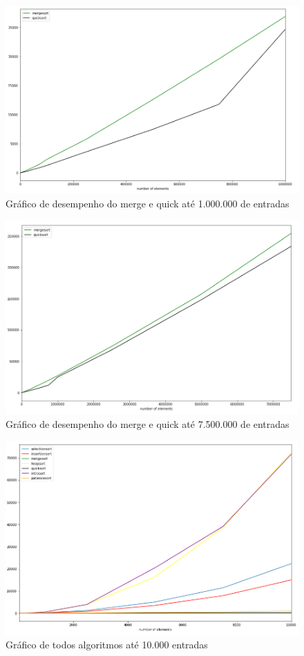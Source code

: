\documentclass[a4paper,12pt]{scrartcl}
\begin{document}
\begin{figure}[H]
\centering
\includegraphics[scale=.70]{images/principais.png}
\caption{Gráfico de desempenho do merge e quick até 1.000.000 de entradas}
\label{mapaPrincipais}
\end{figure}

\begin{figure}[H]
\centering
\includegraphics[scale=.70]{images/principais7M.PNG}
\caption{Gráfico de desempenho do merge e quick até 7.500.000 de entradas}
\label{mapaPrincipais}
\end{figure}

\begin{figure}[H]
\centering
\includegraphics[scale=.70]{images/todos10.png}
\caption{Gráfico de todos algoritmos até 10.000 entradas}
\label{mapaPrincipais}
\end{figure}
\end{document}
